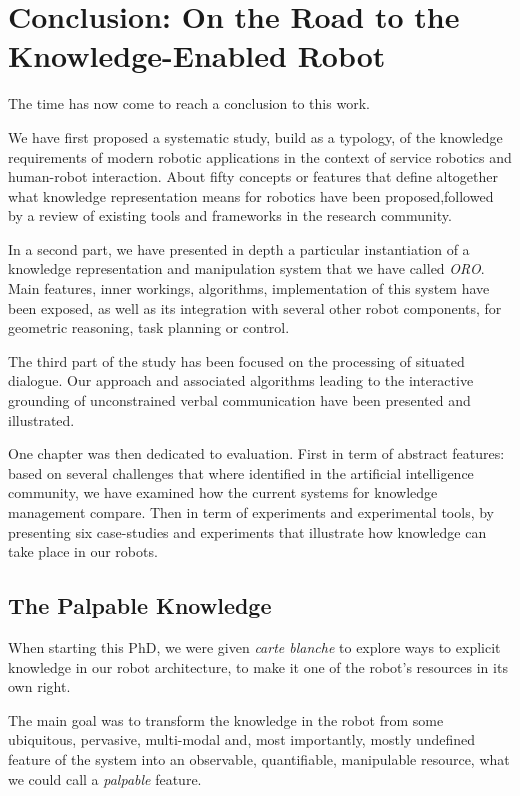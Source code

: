 \chapter{Conclusion: On the Road to the Knowledge-Enabled Robot}
\label{chapter|conclusion}

The time has now come to reach a conclusion to this work.

We have first proposed a systematic study, build as a typology, of the
knowledge requirements of modern robotic applications in the context of service
robotics and human-robot interaction. About fifty concepts or features that
define altogether what knowledge representation means for robotics have been
proposed,followed by a review of existing tools and frameworks in the research
community.

In a second part, we have presented in depth a particular instantiation of a
knowledge representation and manipulation system that we have called
\emph{ORO}.  Main features, inner workings, algorithms, implementation of this
system have been exposed, as well as its integration with several other robot
components, for geometric reasoning, task planning or control.

The third part of the study has been focused on the processing of situated
dialogue.  Our approach and associated algorithms leading to the interactive
grounding of unconstrained verbal communication have been presented and
illustrated.

One chapter was then dedicated to evaluation. First in term of abstract
features: based on several challenges that where identified in the artificial
intelligence community, we have examined how the current systems for knowledge
management compare. Then in term of experiments and experimental tools, by
presenting six case-studies and experiments that illustrate how knowledge can
take place in our robots.

\section{The Palpable Knowledge}

When starting this PhD, we were given \emph{carte blanche} to explore ways to
explicit knowledge in our robot architecture, to make it one of the robot's
resources in its own right.

The main goal was to transform the knowledge in the robot from some ubiquitous,
pervasive, multi-modal and, most importantly, mostly undefined feature of the
system into an observable, quantifiable, manipulable resource, what we could
call a \emph{palpable} feature.

